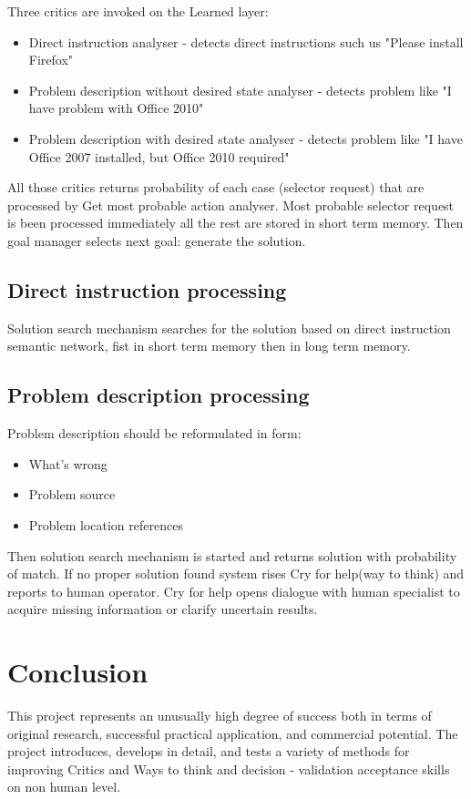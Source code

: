 \documentclass[conference]{IEEEtran}
\begin{document}
Three critics are invoked on the Learned layer:
\begin{itemize}
  \item Direct instruction analyser - detects direct instructions such us "Please install Firefox"
  \item Problem description without desired state analyser - detects problem like "I have problem with Office 2010"
  \item Problem description with desired state analyser - detects problem like "I have Office 2007 installed, but Office 2010 required"
\end{itemize}

All those critics returns probability of each case (selector request) that are processed by Get most probable action analyser. Most probable selector request is been processed immediately all the rest are stored in short term memory. Then goal manager selects next goal: generate the solution.

\subsection{Direct instruction processing}

Solution search mechanism searches for the solution based on direct instruction semantic network, fist in short term memory then in long term memory.

\subsection{Problem description processing}

Problem description should be reformulated in form:
\begin{itemize}
  \item What's wrong
  \item Problem source
  \item Problem location references
\end{itemize}

Then solution search mechanism is started and returns solution with probability of match. If no proper solution found system rises Cry for help(way to think) and reports to human operator.
Cry for help opens dialogue with human specialist to acquire missing information or clarify uncertain results.

\section{Conclusion}
This project represents an unusually high degree of success both in terms of original research, successful practical application, and commercial potential. The project introduces, develops in detail, and tests a variety of methods for improving Critics and Ways to think and decision - validation acceptance skills on non human level.
\end{document}
